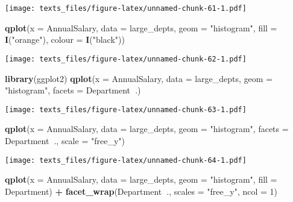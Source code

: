 \documentclass[]{book}
\newenvironment{Shaded}{\begin{snugshade}}{\end{snugshade}}
\newcommand{\DataTypeTok}[1]{\textcolor[rgb]{0.13,0.29,0.53}{#1}}
\newcommand{\DecValTok}[1]{\textcolor[rgb]{0.00,0.00,0.81}{#1}}
\newcommand{\KeywordTok}[1]{\textcolor[rgb]{0.13,0.29,0.53}{\textbf{#1}}}
\newcommand{\NormalTok}[1]{#1}
\newcommand{\OperatorTok}[1]{\textcolor[rgb]{0.81,0.36,0.00}{\textbf{#1}}}
\newcommand{\StringTok}[1]{\textcolor[rgb]{0.31,0.60,0.02}{#1}}
\begin{document}
\texttt{[image: texts\_files/figure-latex/unnamed-chunk-61-1.pdf]}

\begin{Shaded}
\begin{Highlighting}[]
\KeywordTok{qplot}\NormalTok{(}\DataTypeTok{x =}\NormalTok{ AnnualSalary, }\DataTypeTok{data =}\NormalTok{ large_depts, }\DataTypeTok{geom =} \StringTok{"histogram"}\NormalTok{, }\DataTypeTok{fill =} \KeywordTok{I}\NormalTok{(}\StringTok{"orange"}\NormalTok{), }\DataTypeTok{colour =} \KeywordTok{I}\NormalTok{(}\StringTok{"black"}\NormalTok{)) }
\end{Highlighting}
\end{Shaded}

\texttt{[image: texts\_files/figure-latex/unnamed-chunk-62-1.pdf]}

\begin{Shaded}
\begin{Highlighting}[]
\KeywordTok{library}\NormalTok{(ggplot2)}
\KeywordTok{qplot}\NormalTok{(}\DataTypeTok{x =}\NormalTok{ AnnualSalary, }\DataTypeTok{data =}\NormalTok{ large_depts, }\DataTypeTok{geom =} \StringTok{"histogram"}\NormalTok{, }\DataTypeTok{facets =}\NormalTok{ Department}\OperatorTok{~}\NormalTok{.)}
\end{Highlighting}
\end{Shaded}

\texttt{[image: texts\_files/figure-latex/unnamed-chunk-63-1.pdf]}

\begin{Shaded}
\begin{Highlighting}[]
\KeywordTok{qplot}\NormalTok{(}\DataTypeTok{x =}\NormalTok{ AnnualSalary, }\DataTypeTok{data =}\NormalTok{ large_depts, }\DataTypeTok{geom =} \StringTok{"histogram"}\NormalTok{, }\DataTypeTok{facets =}\NormalTok{ Department}\OperatorTok{~}\NormalTok{., }\DataTypeTok{scale =} \StringTok{"free_y"}\NormalTok{) }
\end{Highlighting}
\end{Shaded}

\texttt{[image: texts\_files/figure-latex/unnamed-chunk-64-1.pdf]}

\begin{Shaded}
\begin{Highlighting}[]
\KeywordTok{qplot}\NormalTok{(}\DataTypeTok{x =}\NormalTok{ AnnualSalary, }\DataTypeTok{data =}\NormalTok{ large_depts, }\DataTypeTok{geom =} \StringTok{"histogram"}\NormalTok{, }\DataTypeTok{fill =}\NormalTok{ Department) }\OperatorTok{+}\StringTok{ }
\StringTok{  }\KeywordTok{facet_wrap}\NormalTok{(Department}\OperatorTok{~}\NormalTok{., }\DataTypeTok{scales =} \StringTok{"free_y"}\NormalTok{, }\DataTypeTok{ncol =} \DecValTok{1}\NormalTok{)  }
\end{Highlighting}
\end{Shaded}
\end{document}
